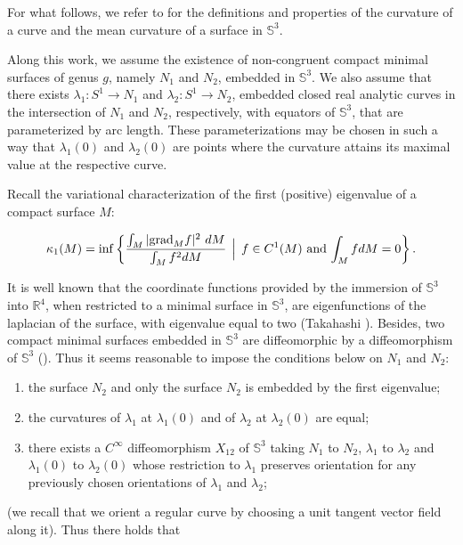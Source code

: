\documentclass{article}
\def\S3{{\mathbb S^3}}
\begin{document}
For what follows, we refer to \cite{sp} for the definitions and properties of the curvature of a curve  and the mean curvature of a surface in $\S3$.

Along this work, we assume the existence of non-congruent compact minimal surfaces of genus $g$, namely $N_1$ and $N_2$, embedded in $\S3$. We also assume that there exists $\lambda_1:S^1 \to N_1$ and $\lambda_2:S^1 \to N_2$, embedded closed real analytic curves in the intersection of $N_1$ and $N_2$, respectively, with equators of $\S3$, that are parameterized by arc length. These parameterizations may be chosen in such a way that $\lambda_1(0)$ and $\lambda_2(0)$ are points where the curvature attains its maximal value at the respective curve.  

Recall the variational characterization of the first (positive) eigenvalue  of a compact surface $M$:


\begin{equation}\label{epa}
\kappa_1(M)=\inf\left\{\dfrac{\int_{M}|\hbox{grad}_{M} f|^2\ dM}{\int_M f^2 dM}\hspace{.06in}\Big|\hspace{.06in}{f\in C^1(M)}\hbox{ and }{\int_M f dM=0}\right\}.
\end{equation}


It is well known that the coordinate functions provided by the immersion of $\S3$ into $\mathbb R^4$, when restricted to a minimal surface in $\S3$, are eigenfunctions of the laplacian of the surface, with eigenvalue equal to two (Takahashi \cite{tk}). Besides, two compact minimal surfaces embedded in $\S3$ are diffeomorphic by a diffeomorphism of $\S3$ (\cite[Th. 3]{l2}). Thus it seems reasonable to impose the conditions below on $N_1$ and $N_2$:

\begin{enumerate}
\item the surface  $N_2$ and only the surface $N_2$ is embedded by the first eigenvalue;
\item the curvatures of $\lambda_1$ at $\lambda_1(0)$ and of $\lambda_2$ at $\lambda_2(0)$ are equal;
\item there exists a $C^{\infty}$ diffeomorphism $X_{12}$ of $\S3$ taking $N_1$ to $N_2$, $\lambda_1$ to $\lambda_2$ and $\lambda_1(0)$ to $\lambda_2(0)$ whose restriction to $\lambda_1$ preserves orientation for any previously chosen orientations of $\lambda_1$ and $\lambda_2$; 
\end{enumerate}
 (we recall that we orient a regular curve by choosing  a unit tangent vector field along it). Thus there holds that
 
\end{document}

